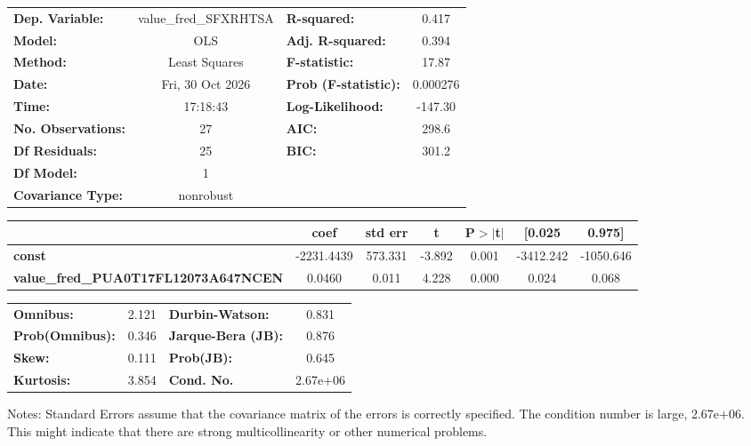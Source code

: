 \begin{center}
\begin{tabular}{lclc}
\toprule
\textbf{Dep. Variable:}                      & value\_fred\_SFXRHTSA & \textbf{  R-squared:         } &     0.417   \\
\textbf{Model:}                              &          OLS          & \textbf{  Adj. R-squared:    } &     0.394   \\
\textbf{Method:}                             &     Least Squares     & \textbf{  F-statistic:       } &     17.87   \\
\textbf{Date:}                               &    Fri, 30 Oct 2026   & \textbf{  Prob (F-statistic):} &  0.000276   \\
\textbf{Time:}                               &        17:18:43       & \textbf{  Log-Likelihood:    } &   -147.30   \\
\textbf{No. Observations:}                   &             27        & \textbf{  AIC:               } &     298.6   \\
\textbf{Df Residuals:}                       &             25        & \textbf{  BIC:               } &     301.2   \\
\textbf{Df Model:}                           &              1        & \textbf{                     } &             \\
\textbf{Covariance Type:}                    &       nonrobust       & \textbf{                     } &             \\
\bottomrule
\end{tabular}
\begin{tabular}{lcccccc}
                                             & \textbf{coef} & \textbf{std err} & \textbf{t} & \textbf{P$> |$t$|$} & \textbf{[0.025} & \textbf{0.975]}  \\
\midrule
\textbf{const}                               &   -2231.4439  &      573.331     &    -3.892  &         0.001        &    -3412.242    &    -1050.646     \\
\textbf{value\_fred\_PUA0T17FL12073A647NCEN} &       0.0460  &        0.011     &     4.228  &         0.000        &        0.024    &        0.068     \\
\bottomrule
\end{tabular}
\begin{tabular}{lclc}
\textbf{Omnibus:}       &  2.121 & \textbf{  Durbin-Watson:     } &    0.831  \\
\textbf{Prob(Omnibus):} &  0.346 & \textbf{  Jarque-Bera (JB):  } &    0.876  \\
\textbf{Skew:}          &  0.111 & \textbf{  Prob(JB):          } &    0.645  \\
\textbf{Kurtosis:}      &  3.854 & \textbf{  Cond. No.          } & 2.67e+06  \\
\bottomrule
\end{tabular}
\end{center}

Notes: \newline
 [1] Standard Errors assume that the covariance matrix of the errors is correctly specified. \newline
 [2] The condition number is large, 2.67e+06. This might indicate that there are \newline
 strong multicollinearity or other numerical problems.
